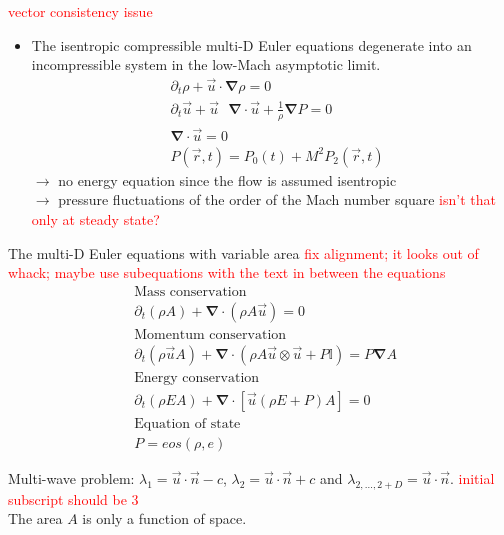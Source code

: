 \documentclass[xcolor=dvipsnames,10pt]{beamer}
\renewcommand{\div}{\boldsymbol{\nabla}\! \cdot \!}
\newcommand{\grad}{\boldsymbol{\nabla}}
\newcommand{\tcr}[1]{\textcolor{red}{#1}}
\begin{document}
\begin{frame}
\begin{block}{}
\tcr{vector consistency issue}
\begin{itemize}
\setlength{\itemsep}{10pt}
\item The isentropic compressible multi-D Euler equations degenerate into an incompressible system in the low-Mach asymptotic limit.
\begin{align}
&\partial_t \rho + \vec{u} \cdot \grad \rho = 0 \nonumber \\
&\partial_t \vec{u} + \vec{u}\text{ } \div \vec{u} + \frac{1}{\rho}\grad P = 0 \nonumber \\
& \div \vec{u} = 0 \nonumber \\
&P( \vec{r},t) = P_0(t) + M^2 P_2(\vec{r},t)\nonumber
\end{align}
$\to$ no energy equation since the flow is assumed isentropic \\
$\to$ pressure fluctuations of the order of the Mach number square \tcr{isn't that only at steady state?}
\end{itemize}
\end{block}
\end{frame}
\begin{frame}
\begin{block}{The multi-D Euler equations with variable area}
\tcr{fix alignment; it looks out of whack; maybe use subequations with the text in between the equations}
\begin{align}
&\text{Mass conservation} \nonumber \\
&\partial_t ( \rho A ) + \div \left( \rho A \vec{u} \right) = 0 \nonumber \\
&\text{Momentum conservation} \nonumber \\
&\partial_t ( \rho \vec{u} A ) + \div \left( \rho A \vec{u} \otimes \vec{u} + P \mathbb{I} \right) = P \grad A \nonumber \\
&\text{Energy conservation} \nonumber \\
&\partial_t ( \rho E A ) + \div \left[ \vec{u} \left( \rho E + P \right) A \right] = 0 \nonumber \\
&\text{Equation of state} \nonumber \\
& P = eos \left( \rho, e \right) \nonumber 
\end{align}
\end{block}
Multi-wave problem: $\lambda_1 = \vec{u} \cdot \vec{n} - c $, $\lambda_2 = \vec{u} \cdot \vec{n} + c $ and $\lambda_{2, \dots, 2+D} = \vec{u} \cdot \vec{n}$. \tcr{initial subscript should be 3} \\
The area $A$ is only a function of space.
\end{frame}
\end{document}
